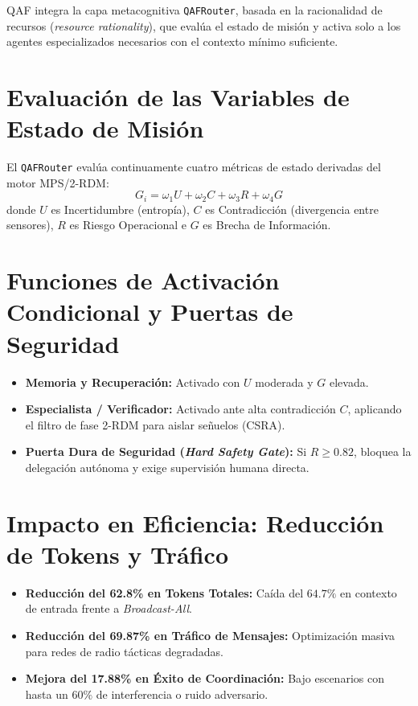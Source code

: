\documentclass[11pt,a4paper,oneside]{report}
\begin{document}
QAF integra la capa metacognitiva \texttt{QAFRouter}, basada en la racionalidad de recursos (\emph{resource rationality}), que evalúa el estado de misión y activa solo a los agentes especializados necesarios con el contexto mínimo suficiente.

\section{Evaluación de las Variables de Estado de Misión}
El \texttt{QAFRouter} evalúa continuamente cuatro métricas de estado derivadas del motor MPS/2-RDM:
\begin{equation}
G_i = \omega_1 U + \omega_2 C + \omega_3 R + \omega_4 G
\end{equation}
donde $U$ es Incertidumbre (entropía), $C$ es Contradicción (divergencia entre sensores), $R$ es Riesgo Operacional e $G$ es Brecha de Información.

\section{Funciones de Activación Condicional y Puertas de Seguridad}
\begin{itemize}
    \item \textbf{Memoria y Recuperación:} Activado con $U$ moderada y $G$ elevada.
    \item \textbf{Especialista / Verificador:} Activado ante alta contradicción $C$, aplicando el filtro de fase 2-RDM para aislar señuelos (CSRA).
    \item \textbf{Puerta Dura de Seguridad (\emph{Hard Safety Gate}):} Si $R \ge 0.82$, bloquea la delegación autónoma y exige supervisión humana directa.
\end{itemize}

\section{Impacto en Eficiencia: Reducción de Tokens y Tráfico}
\begin{itemize}
    \item \textbf{Reducción del 62.8\% en Tokens Totales:} Caída del $64.7\%$ en contexto de entrada frente a \emph{Broadcast-All}.
    \item \textbf{Reducción del 69.87\% en Tráfico de Mensajes:} Optimización masiva para redes de radio tácticas degradadas.
    \item \textbf{Mejora del 17.88\% en Éxito de Coordinación:} Bajo escenarios con hasta un $60\%$ de interferencia o ruido adversario.
\end{itemize}
\end{document}
